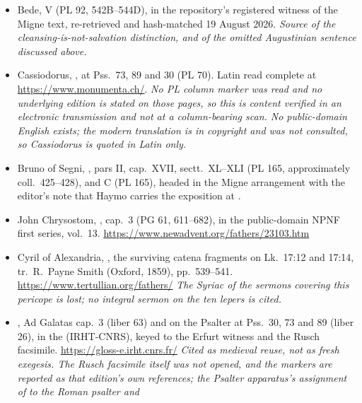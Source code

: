 \begin{itemize}[leftmargin=1.2em, itemsep=0.15em]
{philological, or which relate to the discrepancy and reconciliation of the texts
and versions,'' and substitutes the Douay headings for Bellarmine's prefaces to
each psalm --- so every textual point taken from him here is quoted from the
1611 Latin, and the fact of the omission is stated where it bears on a claim.}
\item Bede,  V (PL 92, 542B--544D), in the
repository's registered witness of the Migne text, re-retrieved and hash-matched
19 August 2026. \textit{Source of the cleansing-is-not-salvation distinction,
and of the omitted Augustinian sentence discussed above.}
\item Cassiodorus, , at Pss.\ 73, 89 and 30 (PL 70).
Latin read complete at \url{https://www.monumenta.ch/}. \textit{No PL column
marker was read and no underlying edition is stated on those pages, so this is
content verified in an electronic transmission and not at a column-bearing
scan. No public-domain English exists; the modern translation is in copyright
and was not consulted, so Cassiodorus is quoted in Latin only.}
\item Bruno of Segni, , pars II, cap.\ XVII,
sectt.\ XL--XLI (PL 165, approximately coll.\ 425--428), and  C
(PL 165), headed  in the Migne
arrangement with the editor's note that Haymo carries the exposition at
.
\item John Chrysostom, ,
cap.~3 (PG 61, 611--682), in the public-domain NPNF first series, vol.~13.
\url{https://www.newadvent.org/fathers/23103.htm}
\item Cyril of Alexandria, , the surviving catena
fragments on Lk.\ 17:12 and 17:14, tr.\ R.~Payne Smith (Oxford, 1859),
pp.~539--541. \url{https://www.tertullian.org/fathers/}
\textit{The Syriac of the sermons covering this pericope is lost; no integral
sermon on the ten lepers is cited.}
\item {}, Ad Galatas cap.~3 (liber 63) and on the Psalter
at Pss.\ 30, 73 and 89 (liber 26), in the  (IRHT-CNRS), keyed to the Erfurt witness and the Rusch facsimile.
\url{https://gloss-e.irht.cnrs.fr/} \textit{Cited as medieval reuse, not as
fresh exegesis. The Rusch facsimile itself was not opened, and the markers are
reported as that edition's own references; the Psalter apparatus's assignment
of}  \textit{to the Roman psalter and} 

\end{itemize}
